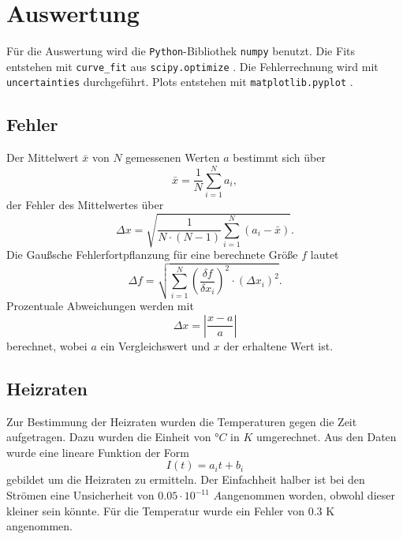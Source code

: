 \section{Auswertung}
\label{sec:Auswertung}

Für die Auswertung wird die \texttt{Python}-Bibliothek \texttt{numpy} \cite{numpy} benutzt. Die Fits entstehen mit \texttt{curve\_fit} aus \texttt{scipy.optimize} \cite{scipy}.
Die Fehlerrechnung wird mit \texttt{uncertainties} \cite{uncertainties} durchgeführt. Plots entstehen mit \texttt{matplotlib.pyplot} \cite{matplotlib}.

\subsection{Fehler}
Der Mittelwert $\bar{x}$ von $N$ gemessenen Werten $a$ bestimmt sich über
\begin{equation}
    \bar{x} = \frac{1}{N} \sum^N_{i=1} a_i,
    \label{eq:mittelwerte}
\end{equation}
der Fehler des Mittelwertes über
\begin{equation}
    \Delta x = \sqrt{\frac{1}{N \cdot (N-1)} \sum^N_{i=1}(a_i - \bar{x})}.
    \label{eq:mittelwerte_fehler}
\end{equation}
Die Gaußsche Fehlerfortpflanzung für eine berechnete Größe $f$ lautet
\begin{equation}
    \Delta f = \sqrt{ \sum^N_{i=1} \left( \frac{\delta f}{\delta x_i}\right)^2 \cdot (\Delta x_i)^2}.
\end{equation}
Prozentuale Abweichungen werden mit
\begin{equation}
    \Delta x = \left|\frac{x - a}{a}\right|
    \label{eq:abweichung}
\end{equation}
berechnet, wobei $a$ ein Vergleichswert und $x$ der erhaltene Wert ist.

\subsection{Heizraten}
Zur Bestimmung der Heizraten wurden die Temperaturen gegen die Zeit aufgetragen. Dazu wurden die
Einheit von $°C$ in $K$ umgerechnet. Aus den Daten wurde eine lineare Funktion der Form 
\begin{equation}
    I(t)= a_it+b_i 
\end{equation}
gebildet um die Heizraten zu ermitteln. Der Einfachheit halber ist bei den Strömen eine Unsicherheit
von $0.05\cdot10^{-11}$ \(A\)angenommen worden, obwohl dieser kleiner sein könnte.
Für die Temperatur wurde ein Fehler von 0.3 K angenommen.

